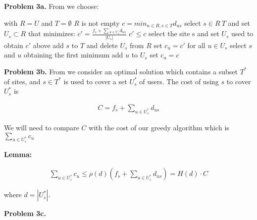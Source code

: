 \documentclass{article}
\begin{document}
\hfill

\textbf{Problem 3a.} From \cite{website:1} we choose:

\begin{codebox}
    \li with $R = U$ and $T = \emptyset$
    \li \While $R$ is not empty \Do
    \li $c = min_{u \in R, s \in T} d_{us}$
    \li select $s \in R \ T$ and set $U_s \subset R$ that minimizes: $c' = \frac{f_s + \sum{}_{u \in U_s}d_{us}}{|U_s|}$
    \li
    \li \If $c' \leq c$ \Then
    \li select the site s and set $U_s$ used to obtain $c'$ above
    \li add $s$ to $T$ and delete $U_s$ from $R$
    \li set $c_u = c'$ for all $u \in U_s$
    \li
    \li \Else
    \li select $s$ and $u$ obtaining the first minimum
    \li add $u$ to $U_s$
    \li set $c_u = c$ \End \End
\end{codebox}

\hfill

\textbf{Problem 3b.} From \cite{website:1} we consider an optimal solution which contains a subset $T^*$ of sites, and $s \in T^*$ is used to cover a set $U_s^*$ of users. The cost of using $s$ to cover $U_s^*$ is

\begin{gather}
    C = f_s + \sum_{u \in U_s^*}d_{us}    
\end{gather}

We will need to compare $C$ with the cost of our greedy algorithm which is $\sum_{u \in U_s^*}c_u$

\hfill

\textbf{Lemma:}

\begin{gather}
    \sum_{u \in U_s^*}c_u \leq \rho(d)(f_s + \sum_{u \in U_s^*}d_{us}) = H(d) \cdot C
\end{gather}

where $d = |U_s^*|$.

\hfill

\textbf{Problem 3c.} 

\newpage
 

\end{document}
